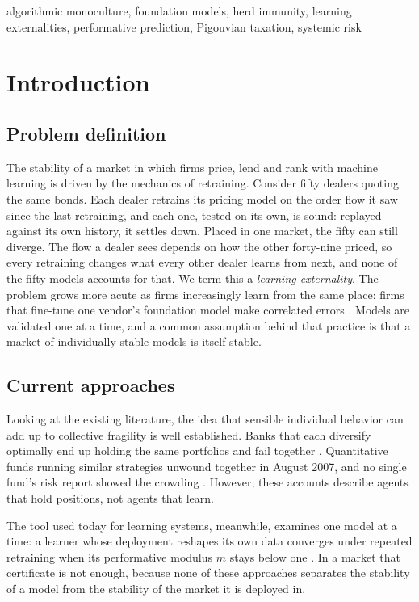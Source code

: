 \documentclass[conference]{IEEEtran}
\theoremstyle{definition}
\begin{document}
\begin{IEEEkeywords}
algorithmic monoculture, foundation models, herd immunity, learning
externalities, performative prediction, Pigouvian taxation, systemic risk
\end{IEEEkeywords}

\section{Introduction}

\subsection{Problem definition}
The stability of a market in which firms price, lend and rank with machine
learning is driven by the mechanics of retraining. Consider fifty dealers
quoting the same bonds. Each dealer retrains its pricing model on the order
flow it saw since the last retraining, and each one, tested on its own, is
sound: replayed against its own history, it settles down. Placed in one
market, the fifty can still diverge. The flow a dealer sees depends on how the
other forty-nine priced, so every retraining changes what every other dealer
learns from next, and none of the fifty models accounts for that. We term this
a \emph{learning externality}. The problem grows more acute as firms
increasingly learn from the same place: firms that fine-tune one vendor's
foundation model make correlated errors \cite{kim2025}. Models are validated
one at a time, and a common assumption behind that practice is that a market
of individually stable models is itself stable.

\subsection{Current approaches}
Looking at the existing literature, the idea that sensible individual behavior
can add up to collective fragility is well established. Banks that each
diversify optimally end up holding the same portfolios and fail together
\cite{beale2011,wagner2010}. Quantitative funds running similar strategies
unwound together in August 2007, and no single fund's risk report showed the
crowding \cite{khandani2007}. However, these accounts describe agents that
hold positions, not agents that learn.

The tool used today for learning systems, meanwhile, examines one model at a
time: a learner whose deployment reshapes its own data converges under
repeated retraining when its performative modulus $m$ stays below one
\cite{perdomo2020}. In a market that certificate is not enough, because none
of these approaches separates the stability of a model from the stability of
the market it is deployed in.
\end{document}
